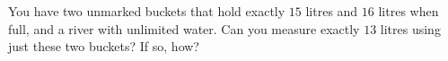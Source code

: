 You have two unmarked buckets that hold exactly $15$ litres and $16$ litres when full, and a river with unlimited water. Can you measure exactly $13$ litres using just these two buckets? If so, how?
